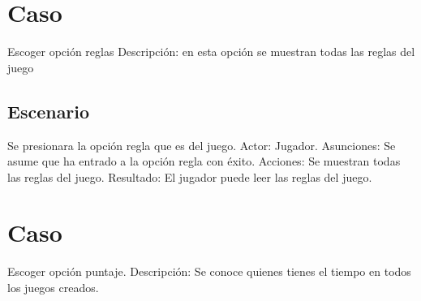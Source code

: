 \section{Caso} Escoger opción reglas\newline\newline
Descripción: en esta opción se muestran todas las reglas del juego

\subsection{Escenario}
Se presionara la opción regla que es del juego.\newline \newline
Actor: Jugador.\newline
Asunciones: Se asume que ha entrado a la opción regla con éxito.\newline
Acciones: Se muestran todas las reglas del juego.\newline
Resultado: El jugador puede leer las reglas del juego.\newline

\section{Caso}
Escoger opción puntaje.\newline \newline
Descripción: Se conoce quienes tienes el tiempo en todos los juegos creados.
